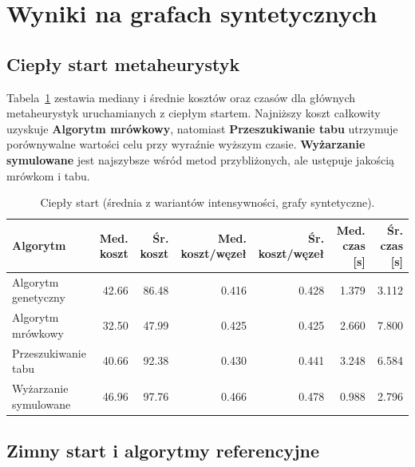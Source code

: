 \section{Wyniki na grafach syntetycznych}

\subsection{Ciepły start metaheurystyk}

Tabela~\ref{tab:dyn-synth-warm} zestawia mediany i średnie kosztów oraz czasów dla głównych metaheurystyk uruchamianych z ciepłym startem. Najniższy koszt całkowity uzyskuje \textbf{Algorytm mrówkowy}, natomiast \textbf{Przeszukiwanie tabu} utrzymuje porównywalne wartości celu przy wyraźnie wyższym czasie. \textbf{Wyżarzanie symulowane} jest najszybsze wśród metod przybliżonych, ale ustępuje jakością mrówkom i tabu.

\begin{table}[H]
  \centering
  \caption{Ciepły start (średnia z wariantów intensywności, grafy syntetyczne).}
  \label{tab:dyn-synth-warm}
  \begin{tabular}{lrrrrrr}
    \toprule
    \textbf{Algorytm}     & \textbf{Med. koszt} & \textbf{Śr. koszt} & \textbf{Med. koszt/węzeł} & \textbf{Śr. koszt/węzeł} & \textbf{Med. czas [s]} & \textbf{Śr. czas [s]} \\
    \midrule
    Algorytm genetyczny   & 42.66               & 86.48              & 0.416                     & 0.428                    & 1.379                  & 3.112                 \\
    Algorytm mrówkowy     & 32.50               & 47.99              & 0.425                     & 0.425                    & 2.660                  & 7.800                 \\
    Przeszukiwanie tabu   & 40.66               & 92.38              & 0.430                     & 0.441                    & 3.248                  & 6.584                 \\
    Wyżarzanie symulowane & 46.96               & 97.76              & 0.466                     & 0.478                    & 0.988                  & 2.796                 \\
  \end{tabular}
\end{table}

\subsection{Zimny start i algorytmy referencyjne}

